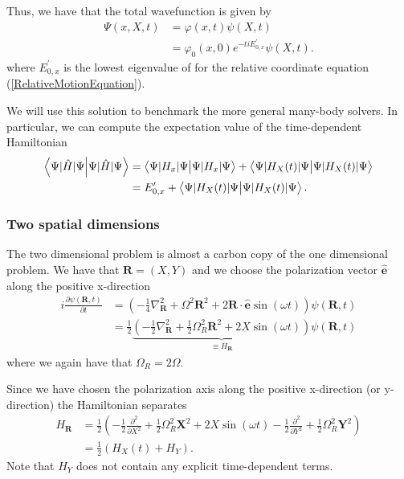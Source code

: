 \documentclass[aip,jcp,reprint,floatfix]{revtex4-1}
\begin{document}
\begin{appendices}
Thus, we have that the total wavefunction is given by 
\begin{align}
 \Psi(x,X,t) &= \varphi(x,t) \psi(X,t) \nonumber \\
 &= \varphi_0(x,0)e^{-tiE_{0,x}^\prime} \psi(X,t).
\end{align}
where $E_{0,x}^\prime$ is the lowest eigenvalue of for the relative coordinate equation (\ref{RelativeMotionEquation}).

We will use this solution to benchmark the more general many-body solvers. In particular, we can compute the expectation value 
of the time-dependent Hamiltonian
\begin{align}
 \braket{\Psi|\hat{H}|\Psi} &= \braket{\Psi|H_x|\Psi} + \braket{\Psi|H_X(t)|\Psi} \nonumber \\
 &= E_{0,x}^\prime + \braket{\Psi|H_X(t)|\Psi}.
\end{align}

\subsubsection{Two spatial dimensions}
The two dimensional problem is almost a carbon copy of the one dimensional problem. We have that $\mathbf{R} = (X,Y)$ and we choose the polarization vector $\hat{\mathbf{e}}$ along the positive x-direction
\begin{align*}
    i \frac{\partial \psi(\mathbf{R},t)}{\partial t} &= \left( -\frac{1}{4}\nabla_\mathbf{R}^2 + \Omega^2 \mathbf{R}^2 + 2\mathbf{R} \cdot \hat{\mathbf{e}} \sin(\omega t) \right) \psi(\mathbf{R},t) \\
    &= \frac{1}{2}\underbrace{\left( -\frac{1}{2}\nabla_\mathbf{R}^2 + \frac{1}{2}\Omega_R^2 \mathbf{R}^2 + 2X \sin(\omega t) \right)}_{\equiv H_\mathbf{R}} \psi(\mathbf{R},t)
\end{align*}
where we again have that $\Omega_R = 2\Omega$.

Since we have chosen the polarization axis along the positive x-direction (or y-direction) the Hamiltonian separates
\begin{align*}
    H_\mathbf{R} &= \frac{1}{2}\left( -\frac{1}{2}\frac{\partial^2}{\partial X^2} + \frac{1}{2}\Omega_R^2 \mathbf{X}^2 + 2X \sin(\omega t) -\frac{1}{2}\frac{\partial^2}{\partial Y^2} + \frac{1}{2}\Omega_R^2 \mathbf{Y}^2 \right) \\
    &= \frac{1}{2}(H_X(t) + H_Y).
\end{align*}
Note that $H_Y$ does not contain any explicit time-dependent terms.


\end{appendices}
\end{document}
